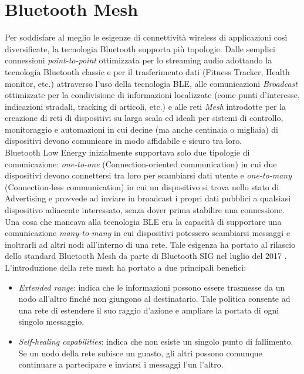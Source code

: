 \chapter{Bluetooth Mesh}
\label{ch:Ble_mesh}

Per soddisfare al meglio le esigenze di connettività wireless di applicazioni così diversificate, la tecnologia Bluetooth supporta più topologie. Dalle semplici connessioni \textit{point-to-point} ottimizzata per lo streaming audio adottando la tecnologia Bluetooth classic e per il trasferimento dati (Fitness Tracker, Health monitor, etc.) attraverso l'uso della tecnologia BLE, alle comunicazioni \textit{Broadcast} ottimizzate per la condivisione di informazioni localizzate (come punti d'interesse, indicazioni stradali, tracking di articoli, etc.) e alle reti \textit{Mesh} introdotte per la creazione di reti di dispositivi su larga scala ed ideali per sistemi di controllo, monitoraggio e automazioni in cui decine (ma anche centinaia o migliaia) di dispositivi devono comunicare in modo affidabile e sicuro tra loro.\\

\noindent Bluetooth Low Energy inizialmente supportava solo due tipologie di comunicazione: \textit{one-to-one} (Connection-oriented communication) in cui due dispositivi devono connettersi tra loro per scambiarsi dati utente e \textit{one-to-many} (Connection-less communication) in cui un dispositivo si trova nello stato di Advertising e provvede ad inviare in broadcast i propri dati pubblici a qualsiasi dispositivo adiacente interessato, senza dover prima stabilire una connessione.\\
Una cosa che mancava alla tecnologia BLE era la capacità di supportare una comunicazione \textit{many-to-many} in cui dispositivi potessero scambiarsi messaggi e inoltrarli ad altri nodi all'interno di una rete. Tale esigenza ha portato al rilascio dello standard Bluetooth Mesh da parte di Bluetooth SIG nel luglio del 2017 \cite{darroudi2017bluetooth}.\\

\noindent L'introduzione della rete mesh ha portato a due principali benefici:
\begin{itemize}
    \item \textit{Extended range}: indica che le informazioni possono essere trasmesse da un nodo all'altro finché non giungono al destinatario. Tale politica consente ad una rete di estendere il suo raggio d'azione e ampliare la portata di ogni singolo messaggio.
    
    \item \textit{Self-healing capabilities}: indica che non esiste un singolo punto di fallimento. Se un nodo della rete subisce un guasto, gli altri possono comunque continuare a partecipare e inviarsi i messaggi l'un l'altro.
\end{itemize}

